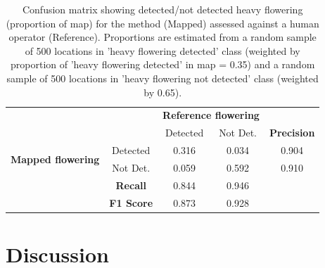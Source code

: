 \documentclass[remotesensing,article,submit,moreauthors,pdftex]{Definitions/mdpi}
\begin{document}
\begin{table}[H]
\centering
\caption{Confusion matrix showing detected/not detected heavy flowering (proportion of map) for the \dndyi{} method (Mapped) assessed against a human operator (Reference). Proportions are estimated from a random sample of 500 locations in 'heavy flowering detected' class (weighted by proportion of 'heavy flowering detected' in map = 0.35) and a random sample of 500 locations in 'heavy flowering not detected' class (weighted by 0.65). \label{tbl:confusion}}
\begin{tabular}{cc|cc|c}
\toprule
                                            &       & \multicolumn{2}{c}{\textbf{Reference flowering}}   & \\
	                                        &           & Detected  & Not Det.  & \textbf{Precision}\\
\midrule
\multirow{2}{*}{\textbf{Mapped flowering}}  & Detected	& 0.316		& 0.034     & 0.904 \\
                                            & Not Det.  & 0.059		& 0.592     & 0.910 \\
\midrule
    &                               \textbf{Recall}     & 0.844     & 0.946     &   \\
    &                               \textbf{F1 Score}   & 0.873     & 0.928     &   \\
\bottomrule
\end{tabular}
\label{tab:confusion}
\end{table}


\section{Discussion}
\end{document}
